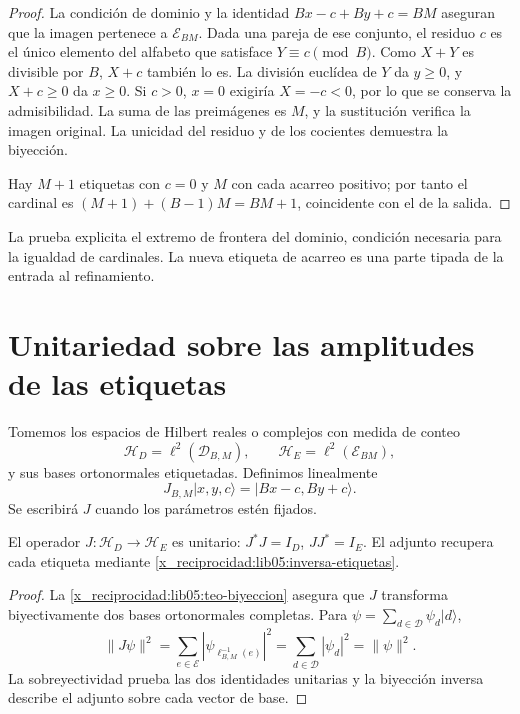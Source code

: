 \begin{proof}
La condición de dominio y la identidad
\(Bx-c+By+c=BM\) aseguran que la imagen pertenece a
\(\mathcal E_{BM}\). Dada una pareja de ese conjunto, el residuo
\(c\) es el único elemento del alfabeto que satisface
\(Y\equiv c\pmod B\). Como \(X+Y\) es divisible por \(B\),
\(X+c\) también lo es. La división euclídea de \(Y\) da
\(y\geq0\), y \(X+c\geq0\) da \(x\geq0\). Si \(c>0\),
\(x=0\) exigiría \(X=-c<0\), por lo que se conserva la
admisibilidad. La suma de las preimágenes es \(M\), y la
sustitución verifica la imagen original. La unicidad del residuo y
de los cocientes demuestra la biyección.

Hay \(M+1\) etiquetas con \(c=0\) y \(M\) con cada acarreo
positivo; por tanto el cardinal es
\((M+1)+(B-1)M=BM+1\), coincidente con el de la salida.
\end{proof}

La prueba explicita el extremo de frontera del dominio, condición
necesaria para la igualdad de cardinales. La nueva etiqueta de acarreo
es una parte tipada de la entrada al refinamiento.

\section{Unitariedad sobre las amplitudes de las etiquetas}
\label{x_reciprocidad:lib05:unitariedad}

Tomemos los espacios de Hilbert reales o complejos con medida de conteo
\begin{equation}
 \mathscr H_D=\ell^2(\mathcal D_{B,M}),\qquad
 \mathscr H_E=\ell^2(\mathcal E_{BM}),
 \label{x_reciprocidad:lib05:hilbert}
\end{equation}
y sus bases ortonormales etiquetadas. Definimos linealmente
\begin{equation}
 J_{B,M}|x,y,c\rangle=|Bx-c,By+c\rangle.
 \label{x_reciprocidad:lib05:j}
\end{equation}
Se escribirá \(J\) cuando los parámetros estén fijados.

\begin{proposition}
\label{x_reciprocidad:lib05:prop-unitaria}
El operador \(J:\mathscr H_D\to\mathscr H_E\) es unitario:
\(J^*J=I_D\), \(JJ^*=I_E\). El adjunto recupera cada etiqueta
mediante \eqref{x_reciprocidad:lib05:inversa-etiquetas}.
\end{proposition}

\begin{proof}
La \cref{x_reciprocidad:lib05:teo-biyeccion} asegura que \(J\) transforma
biyectivamente dos bases ortonormales completas. Para
\(\psi=\sum_{d\in\mathcal D}\psi_d|d\rangle\),
\[
 \|J\psi\|^2
 =\sum_{e\in\mathcal E}|\psi_{\ell_{B,M}^{-1}(e)}|^2
 =\sum_{d\in\mathcal D}|\psi_d|^2=\|\psi\|^2.
\]
La sobreyectividad prueba las dos identidades unitarias y la
biyección inversa describe el adjunto sobre cada vector de base.
\end{proof}

